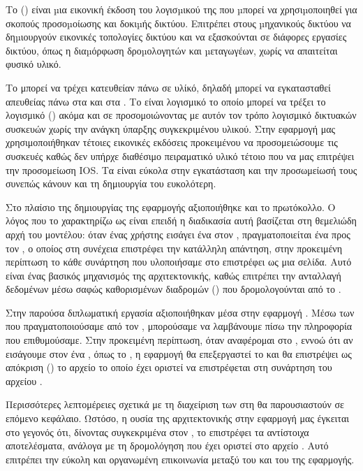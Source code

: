 Το  () είναι µια εικονική έκδοση του λογισµικού  της  που µπορεί να χρησιµοποιηθεί για σκοπούς προσοµοίωσης και δοκιµής δικτύου. Επιτρέπει στους µηχανικούς δικτύου να δηµιουργούν εικονικές τοπολογίες δικτύου και να εξασκούνται σε διάφορες εργασίες δικτύου, όπως η διαµόρφωση δροµολογητών και µεταγωγέων, χωρίς να απαιτείται φυσικό υλικό. 


Το  μπορεί να τρέχει κατευθείαν πάνω σε υλίκό, δηλαδή μπορεί να εγκατασταθεί απευθείας πάνω στα  και στα  . Το  είναι λογισμικό το οποίο μπορεί να τρέξει το λογισμικό () ακόμα και σε  προσομοιώνοντας με αυτόν τον τρόπο λογισμικό δικτυακών συσκευών χωρίς την ανάγκη ύπαρξης συγκεκριμένου υλικού. Στην εφαρμογή μας χρησιμοποιήθηκαν τέτοιες εικονικές εκδόσεις προκειμένου να προσομειώσουμε τις  συσκευές καθώς δεν υπήρχε διαθέσιμο πειραματικό υλικό τέτοιο που να μας επιτρέψει την προσομείωση IOS. Τα  είναι εύκολα στην εγκατάσταση και την προσωμείωσή τους συνεπώς κάνουν και τη δημιουργία του  ευκολότερη.

Στο πλαίσιο της δημιουργίας της εφαρμογής αξιοποιήθηκε και το  πρωτόκολλο. Ο λόγος που το χαρακτηρίζω ως  είναι επειδή η διαδικασία αυτή βασίζεται στη θεμελιώδη αρχή του   μοντέλου: όταν ένας χρήστης εισάγει ένα  στον , πραγματοποιείται ένα  προς τον , ο οποίος στη συνέχεια επιστρέφει την κατάλληλη απάντηση, στην προκειμένη περίπτωση το κάθε συνάρτηση που υλοποιήσαμε στο  επιστρέφει ως   μια  σελίδα. Αυτό είναι ένας βασικός μηχανισμός της  αρχιτεκτονικής, καθώς επιτρέπει την ανταλλαγή δεδομένων μέσω σαφώς καθορισμένων διαδρομών () που δρομολογούνται από το .

Στην παρούσα διπλωματική εργασία αξιοποιήθηκαν  μέσα στην εφαρμογή . Μέσω των   που πραγματοποιούσαμε από τον , μπορούσαμε να λαμβάνουμε πίσω την πληροφορία που επιθυμούσαμε. Στην προκειμένη περίπτωση, όταν αναφέρομαι στο , εννοώ ότι αν εισάγουμε στον  ένα , όπως το , η εφαρμογή θα επεξεργαστεί το  και θα επιστρέψει ως απόκριση () το αρχείο  το οποίο έχει οριστεί να επιστρέφεται στη συνάρτηση  του αρχείου .

Περισσότερες λεπτομέρειες σχετικά με τη διαχείριση των  στη  θα παρουσιαστούν σε επόμενο κεφάλαιο. Ωστόσο, η ουσία της αρχιτεκτονικής  στην εφαρμογή μας έγκειται στο γεγονός ότι, δίνοντας συγκεκριμένα  στον , το  επιστρέφει τα αντίστοιχα αποτελέσματα, ανάλογα με τη δρομολόγηση που έχει οριστεί στο αρχείο . Αυτό επιτρέπει την εύκολη και οργανωμένη επικοινωνία μεταξύ του  και του  της εφαρμογής.


